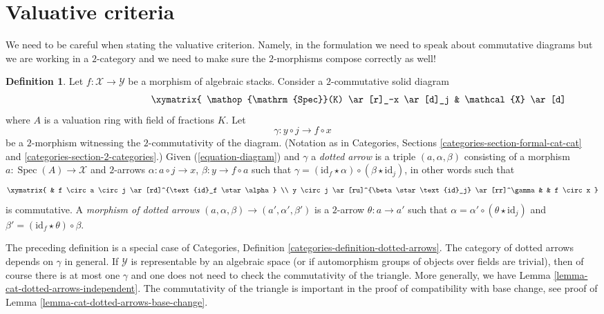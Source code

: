 \documentclass{stacks-project}
\theoremstyle{plain}
\theoremstyle{definition}
\newtheorem{definition}[subsection]{Definition}
\theoremstyle{remark}
\numberwithin{equation}{subsection}
\def\Spec{\mathop{\mathrm{Spec}}}
\begin{document}
\section{Valuative criteria}
\label{section-valuative}

\noindent
We need to be careful when stating the valuative criterion. Namely, in
the formulation we need to speak about commutative diagrams but we are
working in a $2$-category and we need to make sure the $2$-morphisms
compose correctly as well!

\begin{definition}
\label{definition-fill-in-diagram}
Let $f : \mathcal{X} \to \mathcal{Y}$ be a morphism of algebraic stacks.
Consider a $2$-commutative solid diagram
\begin{equation}
\label{equation-diagram}
\vcenter{
\xymatrix{
\Spec(K) \ar[r]_-x \ar[d]_j & \mathcal{X} \ar[d]^f \\
\Spec(A) \ar[r]^-y \ar@{..>}[ru] & \mathcal{Y}
}
}
\end{equation}
where $A$ is a valuation ring with field of fractions $K$. Let
$$
\gamma : y \circ j \longrightarrow f \circ x
$$
be a $2$-morphism witnessing the $2$-commutativity of the diagram.
(Notation as in Categories, Sections \ref{categories-section-formal-cat-cat}
and \ref{categories-section-2-categories}.)
Given (\ref{equation-diagram}) and $\gamma$
a {\it dotted arrow} is a triple $(a, \alpha, \beta)$ consisting of a
morphism $a : \Spec(A) \to \mathcal{X}$ and $2$-arrows
$\alpha : a \circ j \to x$, $\beta : y \to f \circ a$
such that
$\gamma = (\text{id}_f \star \alpha) \circ (\beta \star \text{id}_j)$,
in other words such that
$$
\xymatrix{
& f \circ a \circ j \ar[rd]^{\text{id}_f \star \alpha} \\
y \circ j \ar[ru]^{\beta \star \text{id}_j} \ar[rr]^\gamma & &
f \circ x
}
$$
is commutative. A {\it morphism of dotted arrows}
$(a, \alpha, \beta) \to (a', \alpha', \beta')$ is a
$2$-arrow $\theta : a \to a'$ such that
$\alpha = \alpha' \circ (\theta \star \text{id}_j)$ and
$\beta' = (\text{id}_f \star \theta) \circ \beta$.
\end{definition}

\noindent
The preceding definition is a special case of Categories, 
Definition \ref{categories-definition-dotted-arrows}.
The category of dotted arrows depends on $\gamma$ in general.
If $\mathcal{Y}$ is representable by an algebraic space
(or if automorphism groups of objects over fields are trivial), then
of course there is at most one $\gamma$ and one does not need
to check the commutativity of the triangle. More generally, we
have Lemma \ref{lemma-cat-dotted-arrows-independent}.
The commutativity of the triangle is important in the proof
of compatibility with base change, see
proof of Lemma \ref{lemma-cat-dotted-arrows-base-change}.
\end{document}
